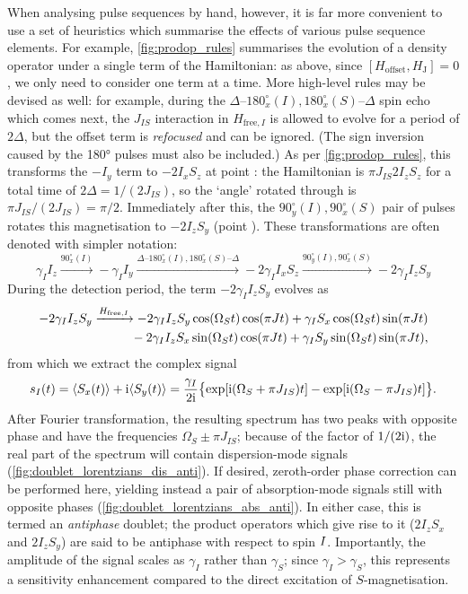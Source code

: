 When analysing pulse sequences by hand, however, it is far more convenient to use a set of heuristics which summarise the effects of various pulse sequence elements.
For example, \cref{fig:prodop_rules} summarises the evolution of a density operator under a single term of the Hamiltonian: as above, since $[H_\text{offset}, H_\text{J}] = 0$, we only need to consider one term at a time.
More high-level rules may be devised as well: for example, during the $\Delta\text{--}180^\circ_{x}(I),180^\circ_{x}(S)\text{--}\Delta$ spin echo which comes next, the $J_{IS}$ interaction in $H_{\text{free},I}$ is allowed to evolve for a period of $2\Delta$, but the offset term is \textit{refocused} and can be ignored.
(The sign inversion caused by the \ang{180} pulses must also be included.)
As per \cref{fig:prodop_rules}, this transforms the $-I_y$ term to $-2I_xS_z$ at point : the Hamiltonian is $\pi J_{IS} 2I_zS_z$ for a total time of $2\Delta = 1/(2J_{IS})$, so the `angle' rotated through is $\pi J_{IS}/(2J_{IS}) = \pi/2$.
Immediately after this, the $90^\circ_y(I),90^\circ_x(S)$ pair of pulses rotates this magnetisation to $-2I_zS_y$ (point ).
These transformations are often denoted with simpler notation:
\begin{equation}
    \label{eq:inept_prodop}
    \gamma_I I_z
    \xrightarrow{90^\circ_x(I)} -\gamma_I I_y
    \xrightarrow{\Delta\text{--}180^\circ_{x}(I),180^\circ_{x}(S)\text{--}\Delta} -2\gamma_I I_xS_z
    \xrightarrow{90^\circ_y(I),90^\circ_x(S)} -2\gamma_I I_zS_y
\end{equation}
During the detection period, the term $-2\gamma_II_zS_y$ evolves as
\begin{align}
    \label{eq:inept_fid_prodop}
    -2\gamma_I I_zS_y \xrightarrow{H_{\text{free},I}} -2\gamma_I I_zS_y\cos(\Omega_St)\cos(\pi Jt) + \gamma_I S_x\cos(\Omega_St)\sin(\pi Jt) \notag{} \\
    \qquad {} - 2\gamma_I I_zS_x\sin(\Omega_St)\cos(\pi Jt) + \gamma_I S_y\sin(\Omega_S t)\sin(\pi Jt),
\end{align}
from which we extract the complex signal
\begin{equation}
    \label{eq:inept_fid}
    s_I(t) = \langle S_x(t) \rangle + \mathrm{i} \langle S_y(t) \rangle = \frac{\gamma_I}{2\mathrm{i}}\bigl\{\exp[\mathrm{i}(\Omega_S + \pi J_{IS})t] - \exp[\mathrm{i}(\Omega_S - \pi J_{IS})t]\bigr\}.
\end{equation}
After Fourier transformation, the resulting spectrum has two peaks with opposite phase and have the frequencies $\Omega_S \pm \pi J_{IS}$; because of the factor of $1/(2\mathrm{i})$, the real part of the spectrum will contain dispersion-mode signals (\cref{fig:doublet_lorentzians_dis_anti}).
If desired, zeroth-order phase correction can be performed here, yielding instead a pair of absorption-mode signals still with opposite phases (\cref{fig:doublet_lorentzians_abs_anti}).
In either case, this is termed an \textit{antiphase} doublet; the product operators which give rise to it ($2I_zS_x$ and $2I_zS_y$) are said to be antiphase with respect to spin $I\/$.
Importantly, the amplitude of the signal scales as $\gamma_I$ rather than $\gamma_S$; since $\gamma_I > \gamma_S$, this represents a sensitivity enhancement compared to the direct excitation of $S$-magnetisation.

